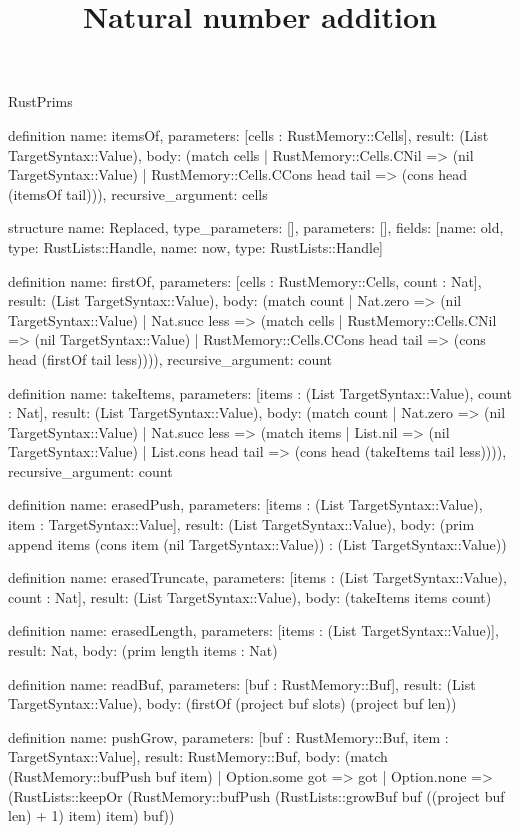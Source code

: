 \begin{lexlean}{RustPrims}
\title{Natural number addition}
\begin{semanticmodule}
definition{
  name: itemsOf,
  parameters: [cells : RustMemory::Cells],
  result: (List TargetSyntax::Value),
  body: (match cells
    | RustMemory::Cells.CNil => (nil TargetSyntax::Value)
    | RustMemory::Cells.CCons head tail => (cons head (itemsOf tail))),
  recursive_argument: cells
}

structure{
  name: Replaced,
  type_parameters: [],
  parameters: [],
  fields: [{name: old, type: RustLists::Handle}, {name: now, type: RustLists::Handle}]
}

definition{
  name: firstOf,
  parameters: [cells : RustMemory::Cells, count : Nat],
  result: (List TargetSyntax::Value),
  body: (match count
    | Nat.zero => (nil TargetSyntax::Value)
    | Nat.succ less => (match cells
      | RustMemory::Cells.CNil => (nil TargetSyntax::Value)
      | RustMemory::Cells.CCons head tail => (cons head (firstOf tail less)))),
  recursive_argument: count
}

definition{
  name: takeItems,
  parameters: [items : (List TargetSyntax::Value), count : Nat],
  result: (List TargetSyntax::Value),
  body: (match count
    | Nat.zero => (nil TargetSyntax::Value)
    | Nat.succ less => (match items
      | List.nil => (nil TargetSyntax::Value)
      | List.cons head tail => (cons head (takeItems tail less)))),
  recursive_argument: count
}

definition{
  name: erasedPush,
  parameters: [items : (List TargetSyntax::Value), item : TargetSyntax::Value],
  result: (List TargetSyntax::Value),
  body: (prim append items (cons item (nil TargetSyntax::Value)) : (List TargetSyntax::Value))
}

definition{
  name: erasedTruncate,
  parameters: [items : (List TargetSyntax::Value), count : Nat],
  result: (List TargetSyntax::Value),
  body: (takeItems items count)
}

definition{
  name: erasedLength,
  parameters: [items : (List TargetSyntax::Value)],
  result: Nat,
  body: (prim length items : Nat)
}

definition{
  name: readBuf,
  parameters: [buf : RustMemory::Buf],
  result: (List TargetSyntax::Value),
  body: (firstOf (project buf slots) (project buf len))
}

definition{
  name: pushGrow,
  parameters: [buf : RustMemory::Buf, item : TargetSyntax::Value],
  result: RustMemory::Buf,
  body: (match (RustMemory::bufPush buf item)
    | Option.some got => got
    | Option.none => (RustLists::keepOr (RustMemory::bufPush (RustLists::growBuf buf ((project buf len) + 1) item) item) buf))
}


\end{semanticmodule}
\end{lexlean}
